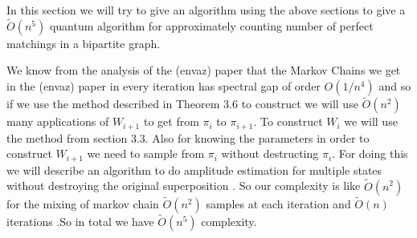 In this section we will try to give an algorithm using the above sections to give a $\tilde{O}(n^5)$ quantum algorithm for approximately counting number of perfect matchings in a bipartite graph.
\begin{flushleft}
	We know from the analysis of the (envaz) paper that the Markov Chains we get in the (envaz) paper in every iteration has spectral gap of order $O(1/n^4)$ and so if we use the method described in Theorem 3.6 to construct we will use $\tilde{O}(n^2)$ many applications of $W_{i+1}$ to get from $\pi_i$ to $\pi_{i+1}$. To construct $W_{i} $ we will use the method from section 3.3. Also for knowing the  parameters in order to construct $W_{i+1}$ we need to sample from $\pi_i$ without destructing $\pi_i$. For doing this we will describe an algorithm to do amplitude estimation for multiple states without destroying the original superposition . So our complexity is like $\tilde{O}(n^2)$ for the mixing of markov chain $\tilde{O}(n^2)$ samples at each  iteration and $\tilde{O}(n)$ iterations .So in total we have $\tilde{O}({n^5})$ complexity.

\end{flushleft}
